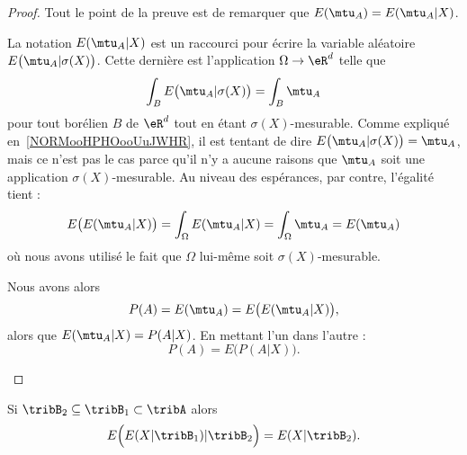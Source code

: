 \begin{proof}
	Tout le point de la preuve est de remarquer que \( E(\mtu_A)=E(\mtu_A|X)\).

	\begin{subproof}
		\spitem[La formule \( E(\mtu_A)=E(\mtu_A|X)\)]

		La notation \( E(\mtu_A|X)\) est un raccourci pour écrire la variable aléatoire \( E\big(\mtu_A|\sigma(X)\big)\). Cette dernière est l'application \( \Omega\to \eR^d\) telle que
		\begin{equation}
			\int_B E\big( \mtu_A|\sigma(X) \big)=\int_B\mtu_A
		\end{equation}
		pour tout borélien \( B\) de \( \eR^d\) tout en étant \( \sigma(X)\)-mesurable. Comme expliqué en~\ref{NORMooHPHOooUuJWHR}, il est tentant de dire \( E\big( \mtu_A|\sigma(X) \big)=\mtu_A\), mais ce n'est pas le cas parce qu'il n'y a aucune raisons que \( \mtu_A\) soit une application \( \sigma(X)\)-mesurable. Au niveau des espérances, par contre, l'égalité tient :
		\begin{equation}
			E\big( E(\mtu_A|X) \big)=\int_{\Omega}E(\mtu_A|X)=\int_{\Omega}\mtu_A=E(\mtu_A)
		\end{equation}
		où nous avons utilisé le fait que \( \Omega\) lui-même soit \( \sigma(X)\)-mesurable.

		\spitem[La preuve]

		Nous avons alors
		\begin{equation}
			P(A)=E(\mtu_A)=E\big( E(\mtu_A|X) \big),
		\end{equation}
		alors que \( E(\mtu_A|X)=P(A|X)\). En mettant l'un dans l'autre :
		\begin{equation}
			P(A)=E\big( P(A|X) \big).
		\end{equation}
	\end{subproof}
\end{proof}

\begin{proposition}     \label{PropRGcscXj}
	Si \( \tribB_2\subseteq\tribB_1\subset\tribA\) alors
	\begin{equation}
		E\Big( E(X|\tribB_1)|\tribB_2 \Big)=E(X|\tribB_2).
	\end{equation}
\end{proposition}

